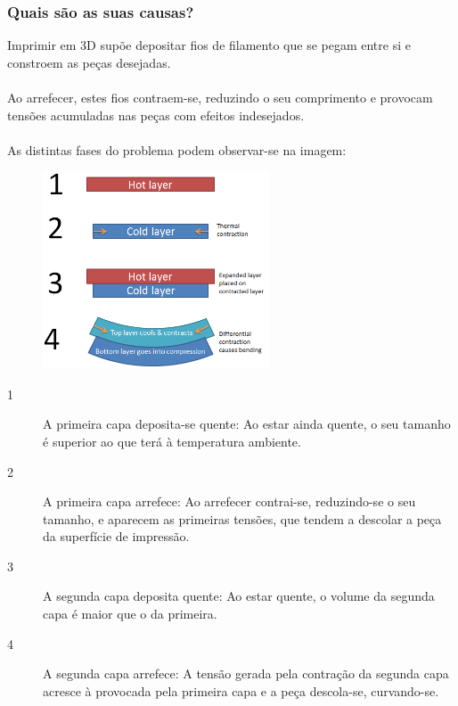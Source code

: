 \documentclass[11pt,a4paper]{article}
\begin{document}
		\subsubsection{Quais são as suas causas?}Imprimir em 3D supõe depositar fios de filamento que se pegam entre si e constroem as peças desejadas.
\\\\
Ao arrefecer, estes fios contraem-se, reduzindo o seu comprimento e provocam tensões acumuladas nas peças com efeitos indesejados.
\\\\
As distintas fases do problema podem observar-se na imagem:
\begin{figure}[H]
\centering
\includegraphics[width=0.6\textwidth,cfbox=azul_marcos 4pt 0pt]{FOTOS/CAUSA_WARPING_1}
\end{figure}

\begin{description}
\item[1] A primeira capa deposita-se quente: Ao estar ainda quente, o seu tamanho é superior ao que terá à temperatura ambiente.
\item[2] A primeira capa arrefece: Ao arrefecer contrai-se, reduzindo-se o seu tamanho, e aparecem as primeiras tensões, que tendem a descolar a peça da superfície de impressão.
\item[3] A segunda capa deposita quente: Ao estar quente, o volume da segunda capa é maior que o da primeira.
\item[4] A segunda capa arrefece: A tensão gerada pela contração da segunda capa acresce à provocada pela primeira capa e a peça descola-se, curvando-se.
\end{description}
\end{document}
